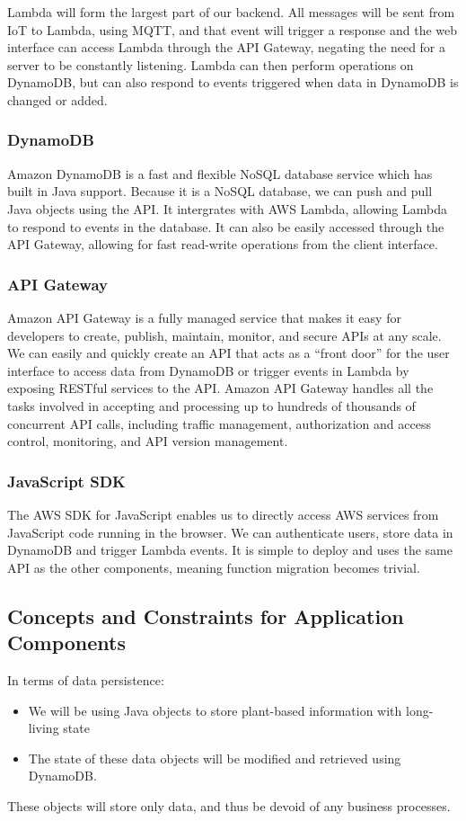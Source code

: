 \documentclass{article}
\begin{document}
		Lambda will form the largest part of our backend. All messages will be sent from IoT to Lambda, using MQTT, and that event will trigger a response and the web interface can access Lambda through the API Gateway, negating the need for a server to be constantly listening. Lambda can then perform operations on DynamoDB, but can also respond to events triggered when data in DynamoDB is changed or added. 
	\subsubsection{DynamoDB}
		Amazon DynamoDB is a fast and flexible NoSQL database service which has built in Java support. Because it is a NoSQL database, we can push and pull Java objects using the API. It intergrates with AWS Lambda, allowing Lambda to respond to events in the database. It can also be easily accessed through the API Gateway, allowing for fast read-write operations from the client interface.
	\subsubsection{API Gateway}
		Amazon API Gateway is a fully managed service that makes it easy for developers to create, publish, maintain, monitor, and secure APIs at any scale. We can easily and quickly create an API that acts as a “front door” for the user interface to access data from DynamoDB or trigger events in Lambda by exposing RESTful services to the API. Amazon API Gateway handles all the tasks involved in accepting and processing up to hundreds of thousands of concurrent API calls, including traffic management, authorization and access control, monitoring, and API version management.
	\subsubsection{JavaScript SDK}
		The AWS SDK for JavaScript enables us to directly access AWS services from JavaScript code running in the browser. We can authenticate users, store data in DynamoDB and trigger Lambda events. It is simple to deploy and uses the same API as the other components, meaning function migration becomes trivial.

\subsection{Concepts and Constraints for Application Components}
In terms of data persistence:
\begin{itemize}
	\item We will be using Java objects to store plant-based information with long-living state
	\item The state of these data objects will be modified and retrieved using DynamoDB.
\end{itemize}
These objects will store only data, and thus be devoid of any business processes.
\end{document}
